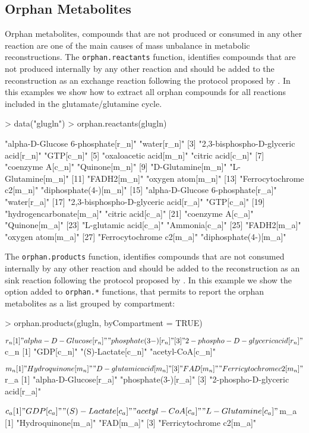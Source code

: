 \subsection*{Orphan Metabolites}
Orphan metabolites, compounds that are not produced or consumed in any other reaction are one of the main causes of mass unbalance in metabolic reconstructions. The \texttt{orphan.reactants} function, identifies compounds that are not produced internally by any other reaction and should be added to the reconstruction as an exchange reaction following the protocol proposed by \cite{Thiele2010}.  In this examples we show how to extract all orphan compounds for all reactions included in the glutamate/glutamine cycle.
\begin{Schunk}
\begin{Sinput}
> data("glugln")
> orphan.reactants(glugln)
\end{Sinput}
\begin{Soutput}
 [1] "alpha-D-Glucose 6-phosphate[r_n]"    "water[r_n]"
 [3] "2,3-bisphospho-D-glyceric acid[r_n]" "GTP[c_n]"
 [5] "oxaloacetic acid[m_n]"               "citric acid[c_n]"
 [7] "coenzyme A[c_n]"                     "Quinone[m_n]"
 [9] "D-Glutamine[m_n]"                    "L-Glutamine[m_n]"
[11] "FADH2[m_n]"                          "oxygen atom[m_n]"
[13] "Ferrocytochrome c2[m_n]"             "diphosphate(4-)[m_n]"
[15] "alpha-D-Glucose 6-phosphate[r_a]"    "water[r_a]"
[17] "2,3-bisphospho-D-glyceric acid[r_a]" "GTP[c_a]"
[19] "hydrogencarbonate[m_a]"              "citric acid[c_a]"
[21] "coenzyme A[c_a]"                     "Quinone[m_a]"
[23] "L-glutamic acid[c_a]"                "Ammonia[c_a]"
[25] "FADH2[m_a]"                          "oxygen atom[m_a]"
[27] "Ferrocytochrome c2[m_a]"             "diphosphate(4-)[m_a]"
\end{Soutput}
The \texttt{orphan.products} function, identifies compounds that are not consumed internally by any other reaction and should be added to the reconstruction as an sink reaction following the protocol proposed by \cite{Thiele2010}. In this example we show the option added to \texttt{orphan.*} functions, that permits to report the orphan metabolites as a list grouped by compartment:
\begin{Sinput}
> orphan.products(glugln, byCompartment = TRUE)
\end{Sinput}
\begin{Soutput}
$r_n
[1] "alpha-D-Glucose[r_n]"           "phosphate(3-)[r_n]"
[3] "2-phospho-D-glyceric acid[r_n]"

$c_n
[1] "GDP[c_n]"         "(S)-Lactate[c_n]" "acetyl-CoA[c_n]"

$m_n
[1] "Hydroquinone[m_n]"       "D-glutamic acid[m_n]"
[3] "FAD[m_n]"                "Ferricytochrome c2[m_n]"

$r_a
[1] "alpha-D-Glucose[r_a]"           "phosphate(3-)[r_a]"
[3] "2-phospho-D-glyceric acid[r_a]"

$c_a
[1] "GDP[c_a]"         "(S)-Lactate[c_a]" "acetyl-CoA[c_a]"  "L-Glutamine[c_a]"

$m_a
[1] "Hydroquinone[m_a]"       "FAD[m_a]"
[3] "Ferricytochrome c2[m_a]"
\end{Soutput}
\end{Schunk}
